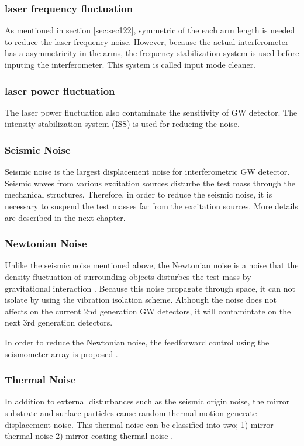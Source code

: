 \subsubsection{laser frequency fluctuation}
As mentioned in section \ref{sec:sec122}, symmetric of the each arm length is needed to reduce the laser frequency noise. However, because the actual interferometer has a asymmetricity in the arms, the frequency stabilization system is used before inputing the interferometer. This system is called input mode cleaner.

\subsubsection{laser power fluctuation}
The laser power fluctuation also contaminate the sensitivity of GW detector. The intensity stabilization system (ISS) is used for reducing the noise.

\subsubsection{Seismic Noise}
Seismic noise is the largest displacement noise for interferometric GW detector. Seismic waves from various excitation sources disturbe the test mass through the mechanical structures. Therefore, in order to reduce the seismic noise, it is necessary to suspend the test masses far from the excitation sources. More details are described in the next chapter.

\subsubsection{Newtonian Noise}
Unlike the seismic noise mentioned above, the Newtonian noise is a noise that the density fluctuation of surrounding objects disturbes the test mass by gravitational interaction \cite{harms2015terrestrial}. Because this noise propagate through space, it can not isolate by using the vibration isolation scheme. Although the noise does not affects on the current 2nd generation GW detectors, it will contamintate on the next 3rd generation detectors.

In order to reduce the Newtonian noise, the feedforward control using the seismometer array is proposed \cite{driggers2015noise}.

\subsubsection{Thermal Noise}
In addition to external disturbances such as the seismic origin noise, the mirror substrate and surface particles cause random thermal motion generate displacement noise. This thermal noise can be classified into two; 1) mirror thermal noise 2) mirror coating thermal noise \cite{dan2016study}.

